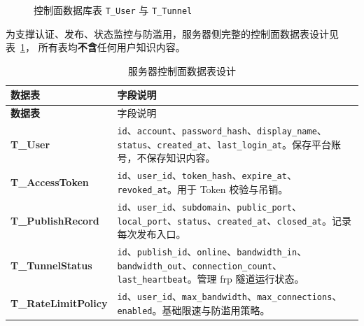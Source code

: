 \documentclass[UTF8,a4paper,12pt]{ctexart}
\newcommand{\keypoint}[1]{\textcolor{whu}{\textbf{#1}}}
\newcommand{\code}[1]{\texttt{#1}}
\begin{document}
\begin{figure}[H]
  \centering
  \caption{控制面数据库表 \code{T\_User} 与 \code{T\_Tunnel}}
  \label{fig:db}
\end{figure}

\noindent 为支撑认证、发布、状态监控与防滥用，服务器侧完整的控制面数据表设计见表~\ref{tab:servertables}，
所有表均\keypoint{不含}任何用户知识内容。

\begin{longtable}{>{\bfseries\ttfamily}p{3.4cm}p{10.6cm}}
  \caption{服务器控制面数据表设计}\label{tab:servertables}\\
  \toprule
  数据表 & 字段说明 \\
  \midrule\endfirsthead
  \toprule
  数据表 & 字段说明 \\
  \midrule\endhead
  T\_User          & \code{id}、\code{account}、\code{password\_hash}、\code{display\_name}、\code{status}、\code{created\_at}、\code{last\_login\_at}。保存平台账号，不保存知识内容。\\
  T\_AccessToken   & \code{id}、\code{user\_id}、\code{token\_hash}、\code{expire\_at}、\code{revoked\_at}。用于 Token 校验与吊销。\\
  T\_PublishRecord & \code{id}、\code{user\_id}、\code{subdomain}、\code{public\_port}、\code{local\_port}、\code{status}、\code{created\_at}、\code{closed\_at}。记录每次发布入口。\\
  T\_TunnelStatus  & \code{id}、\code{publish\_id}、\code{online}、\code{bandwidth\_in}、\code{bandwidth\_out}、\code{connection\_count}、\code{last\_heartbeat}。管理 frp 隧道运行状态。\\
  T\_RateLimitPolicy & \code{id}、\code{user\_id}、\code{max\_bandwidth}、\code{max\_connections}、\code{enabled}。基础限速与防滥用策略。\\
  \bottomrule
\end{longtable}
\end{document}
